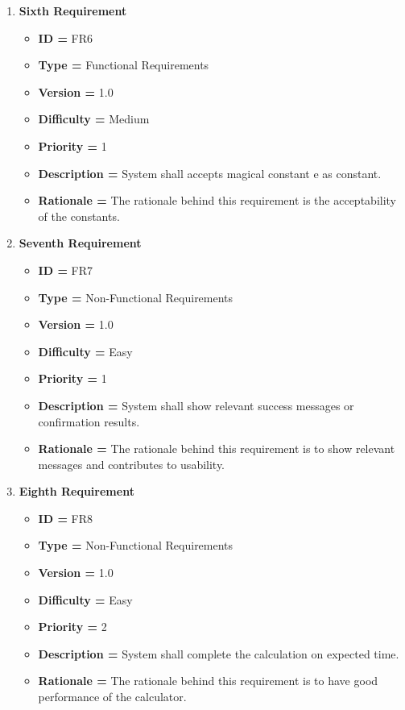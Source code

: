 \documentclass[a4paper,12pt]{article}
\begin{document}
\begin{enumerate}
    \item\textbf{Sixth  Requirement}
    	 \begin{itemize}
        \item \textbf{ID = } FR6
        \item \textbf{Type = } Functional Requirements
        \item \textbf{Version = } 1.0
        \item \textbf{Difficulty = } Medium
        \item \textbf{Priority = } 1
        \item \textbf{Description = } System shall accepts magical constant e as constant.
        \item \textbf{Rationale = }	The rationale behind this requirement is the acceptability of the constants.
        \end{itemize}
    \item\textbf{Seventh  Requirement}
    	 \begin{itemize}
        \item \textbf{ID = } FR7
        \item \textbf{Type = } Non-Functional Requirements
        \item \textbf{Version = } 1.0
        \item \textbf{Difficulty = } Easy
        \item \textbf{Priority = } 1
        \item \textbf{Description = } System shall show relevant success messages or confirmation results.
        \item \textbf{Rationale = }	The rationale behind this requirement is to show relevant messages and contributes to usability.
        \end{itemize}
        
    \item\textbf{Eighth  Requirement}
    	 \begin{itemize}
        \item \textbf{ID = } FR8
        \item \textbf{Type = } Non-Functional Requirements
        \item \textbf{Version = } 1.0
        \item \textbf{Difficulty = } Easy
        \item \textbf{Priority = } 2
        \item \textbf{Description = } System shall complete the calculation on expected time.
        \item \textbf{Rationale = }	The rationale behind this requirement is to have good performance of the calculator.
        \end{itemize}
    \end{enumerate}
\end{document}
